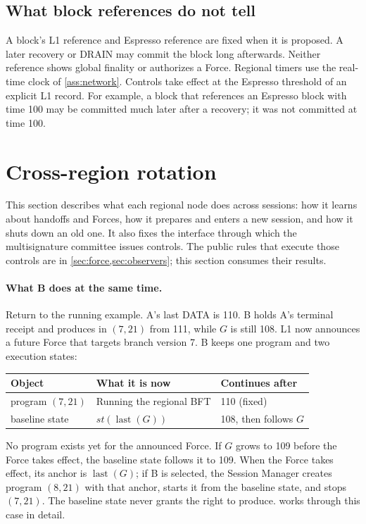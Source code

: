 \documentclass[11pt,a4paper]{article}
\newcounter{protocol}
\begin{document}
\subsection{What block references do not tell}
\label{sec:late-receipt}
A block's L1 reference and Espresso reference are fixed when it
is proposed. A later recovery or DRAIN may commit the block long
afterwards. Neither reference shows global finality or authorizes a
Force. Regional timers use the real-time clock of \cref{ass:network}.
Controls take effect at the Espresso threshold of an explicit L1 record.
For example, a block that references an Espresso block with time 100 may
be committed much later after a recovery; it was not committed at time
100.

\section{Cross-region rotation}
\label{sec:xprotocols}
This section describes what each regional node does across sessions:
how it learns about handoffs and Forces, how it prepares and enters a new
session, and how it shuts down an old one. It also fixes the interface
through which the multisignature committee issues controls. The public
rules that execute those controls are in \cref{sec:force,sec:observers};
this section consumes their results.

\paragraph{What B does at the same time.}
Return to the running example. A's last DATA is 110. B holds A's
terminal receipt and produces in $(7,21)$ from 111, while $G$ is still
108. L1 now announces a future Force that targets branch version 7. B
keeps one program and two execution states:
\begin{center}\small
\begin{tabular}{@{}lll@{}}\toprule
Object & What it is now & Continues after\\\midrule
program $(7,21)$ & Running the regional BFT & 110 (fixed)\\
baseline state & $\mathit{st}(\operatorname{last}(G))$ & 108, then follows $G$\\\bottomrule
\end{tabular}
\end{center}
No program exists yet for the announced Force. If $G$ grows to 109
before the Force takes effect, the baseline state follows it to 109.
When the Force takes effect, its anchor is $\operatorname{last}(G)$; if
B is selected, the Session Manager creates program $(8,21)$ with that
anchor, starts it from the baseline state, and stops $(7,21)$. The
baseline state never grants the right to produce.
 works through this case in detail.
\end{document}
